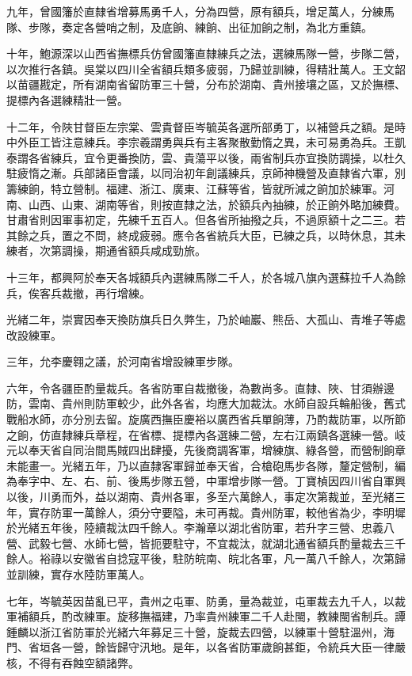 \begin{pinyinscope}
九年，曾國籓於直隸省增募馬勇千人，分為四營，原有額兵，增足萬人，分練馬隊、步隊，奏定各營哨之制，及底餉、練餉、出征加餉之制，為北方重鎮。

十年，鮑源深以山西省撫標兵仿曾國籓直隸練兵之法，選練馬隊一營，步隊二營，以次推行各鎮。吳棠以四川全省額兵類多疲弱，乃歸並訓練，得精壯萬人。王文韶以苗疆戡定，所有湖南省留防軍三十營，分布於湖南、貴州接壤之區，又於撫標、提標內各選練精壯一營。

十二年，令陜甘督臣左宗棠、雲貴督臣岑毓英各選所部勇丁，以補營兵之額。是時中外臣工皆注意練兵。李宗羲謂勇與兵有主客聚散勤惰之異，未可易勇為兵。王凱泰謂各省練兵，宜令更番換防，雲、貴蕩平以後，兩省制兵亦宜換防調操，以杜久駐疲惰之漸。兵部諸臣會議，以同治初年創議練兵，京師神機營及直隸省六軍，別籌練餉，特立營制。福建、浙江、廣東、江蘇等省，皆就所減之餉加於練軍。河南、山西、山東、湖南等省，則按直隸之法，於額兵內抽練，於正餉外略加練費。甘肅省則因軍事初定，先練千五百人。但各省所抽撥之兵，不過原額十之二三。若其餘之兵，置之不問，終成疲弱。應令各省統兵大臣，已練之兵，以時休息，其未練者，次第調操，期通省額兵咸成勁旅。

十三年，都興阿於奉天各城額兵內選練馬隊二千人，於各城八旗內選蘇拉千人為餘兵，俟客兵裁撤，再行增練。

光緒二年，崇實因奉天換防旗兵日久弊生，乃於岫巖、熊岳、大孤山、青堆子等處改設練軍。

三年，允李慶翱之議，於河南省增設練軍步隊。

六年，令各疆臣酌量裁兵。各省防軍自裁撤後，為數尚多。直隸、陜、甘須辦邊防，雲南、貴州則防軍較少，此外各省，均應大加裁汰。水師自設兵輪船後，舊式戰船水師，亦分別去留。旋廣西撫臣慶裕以廣西省兵單餉薄，乃酌裁防軍，以所節之餉，仿直隸練兵章程，在省標、提標內各選練二營，左右江兩鎮各選練一營。岐元以奉天省自同治間馬賊四出肆擾，先後商調客軍，增練旗、綠各營，而營制餉章未能畫一。光緒五年，乃以直隸客軍歸並奉天省，合槍砲馬步各隊，釐定營制，編為奉字中、左、右、前、後馬步隊五營，中軍增步隊一營。丁寶楨因四川省自軍興以後，川勇而外，益以湖南、貴州各軍，多至六萬餘人，事定次第裁並，至光緒三年，實存防軍一萬餘人，須分守要隘，未可再裁。貴州防軍，較他省為少，李明墀於光緒五年後，陸續裁汰四千餘人。李瀚章以湖北省防軍，若升字三營、忠義八營、武毅七營、水師七營，皆扼要駐守，不宜裁汰，就湖北通省額兵酌量裁去三千餘人。裕祿以安徽省自捻寇平後，駐防皖南、皖北各軍，凡一萬八千餘人，次第歸並訓練，實存水陸防軍萬人。

七年，岑毓英因苗亂已平，貴州之屯軍、防勇，量為裁並，屯軍裁去九千人，以裁軍補額兵，酌改練軍。旋移撫福建，乃率貴州練軍二千人赴閩，教練閩省制兵。譚鍾麟以浙江省防軍於光緒六年募足三十營，旋裁去四營，以練軍十營駐溫州，海門、省垣各一營，餘皆歸守汛地。是年，以各省防軍歲餉甚鉅，令統兵大臣一律嚴核，不得有吞蝕空額諸弊。


\end{pinyinscope}
